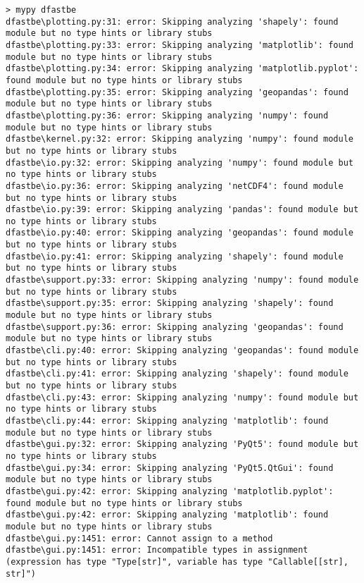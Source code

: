 \begin{Verbatim}[fontsize=\tiny]
> mypy dfastbe
dfastbe\plotting.py:31: error: Skipping analyzing 'shapely': found module but no type hints or library stubs
dfastbe\plotting.py:33: error: Skipping analyzing 'matplotlib': found module but no type hints or library stubs
dfastbe\plotting.py:34: error: Skipping analyzing 'matplotlib.pyplot': found module but no type hints or library stubs
dfastbe\plotting.py:35: error: Skipping analyzing 'geopandas': found module but no type hints or library stubs
dfastbe\plotting.py:36: error: Skipping analyzing 'numpy': found module but no type hints or library stubs
dfastbe\kernel.py:32: error: Skipping analyzing 'numpy': found module but no type hints or library stubs
dfastbe\io.py:32: error: Skipping analyzing 'numpy': found module but no type hints or library stubs
dfastbe\io.py:36: error: Skipping analyzing 'netCDF4': found module but no type hints or library stubs
dfastbe\io.py:39: error: Skipping analyzing 'pandas': found module but no type hints or library stubs
dfastbe\io.py:40: error: Skipping analyzing 'geopandas': found module but no type hints or library stubs
dfastbe\io.py:41: error: Skipping analyzing 'shapely': found module but no type hints or library stubs
dfastbe\support.py:33: error: Skipping analyzing 'numpy': found module but no type hints or library stubs
dfastbe\support.py:35: error: Skipping analyzing 'shapely': found module but no type hints or library stubs
dfastbe\support.py:36: error: Skipping analyzing 'geopandas': found module but no type hints or library stubs
dfastbe\cli.py:40: error: Skipping analyzing 'geopandas': found module but no type hints or library stubs
dfastbe\cli.py:41: error: Skipping analyzing 'shapely': found module but no type hints or library stubs
dfastbe\cli.py:43: error: Skipping analyzing 'numpy': found module but no type hints or library stubs
dfastbe\cli.py:44: error: Skipping analyzing 'matplotlib': found module but no type hints or library stubs
dfastbe\gui.py:32: error: Skipping analyzing 'PyQt5': found module but no type hints or library stubs
dfastbe\gui.py:34: error: Skipping analyzing 'PyQt5.QtGui': found module but no type hints or library stubs
dfastbe\gui.py:42: error: Skipping analyzing 'matplotlib.pyplot': found module but no type hints or library stubs
dfastbe\gui.py:42: error: Skipping analyzing 'matplotlib': found module but no type hints or library stubs
dfastbe\gui.py:1451: error: Cannot assign to a method
dfastbe\gui.py:1451: error: Incompatible types in assignment (expression has type "Type[str]", variable has type "Callable[[str], str]")

\end{Verbatim}
